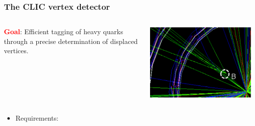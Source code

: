 \begin{frame}
  \frametitle{The CLIC vertex detector}

  \begin{columns}
    \textcolor{Red}{\textbf{Goal}}: Efficient tagging of heavy quarks
    through a precise determination of displaced vertices.


    \centering
    \includegraphics[width=\textwidth]{figures/secondary_vertex.png}
  \end{columns}

  \begin{itemize}
  \item Requirements:
  \end{itemize}

  \begin{columns}


\end{columns}
\end{frame}
